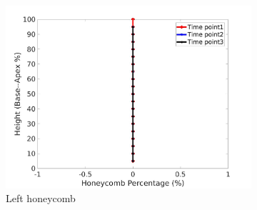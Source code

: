 \begin{figure}[H]
\begin{subfigure}{.42\linewidth}
  \includegraphics[width=\linewidth,trim={{.0\wd0} {.0\wd0} {.0\wd0} {.0\wd0}},clip]{Appendix/Image_AppexA/BaseToApex/IPF3LeftLungHoneycombDiseaseAgainstHeight.jpg} %
  \caption{Left honeycomb}
  \label{fig:IPF3DiseaseAgainstHeight-e} 
\end{subfigure} 
\begin{subfigure}{.42\linewidth}%

\end{subfigure}
\end{figure}
